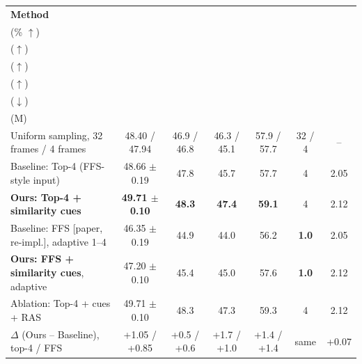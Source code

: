 \documentclass[8pt,a4paper]{article}
\begin{document}
\begin{center}


\label{tab:results}

\small

\begin{tabularx}{\linewidth}{
    @{}X c c c c c c@{}
}

\toprule

\textbf{Method}
&
\makecell{\textbf{Acc}\\(\% $\uparrow$)}
&
\makecell{\textbf{Causal}\\($\uparrow$)}
&
\makecell{\textbf{Temporal}\\($\uparrow$)}
&
\makecell{\textbf{Descr.}\\($\uparrow$)}
&
\makecell{\textbf{Frames}\\($\downarrow$)}
&
\makecell{\textbf{Params}\\(M)}
\\

\midrule

Uniform sampling, 32 frames / 4 frames
& 48.40 / 47.94 & 46.9 / 46.8 & 46.3 / 45.1 & 57.9 / 57.7 & 32 / 4 & -- \\

Baseline: Top-4 (FFS-style input)
& 48.66 $\pm$ 0.19 & 47.8 & 45.7 & 57.7 & 4 & 2.05 \\

\textbf{Ours: Top-4 + similarity cues}
& \textbf{49.71 $\pm$ 0.10} & \textbf{48.3} & \textbf{47.4} & \textbf{59.1} & 4 & 2.12 \\

Baseline: FFS [paper, re-impl.], adaptive 1--4
& 46.35 $\pm$ 0.19 & 44.9 & 44.0 & 56.2 & \textbf{1.0} & 2.05 \\

\textbf{Ours: FFS + similarity cues}, adaptive
& 47.20 $\pm$ 0.10 & 45.4 & 45.0 & 57.6 & \textbf{1.0} & 2.12 \\

Ablation: Top-4 + cues + RAS
& 49.71 $\pm$ 0.10 & 48.3 & 47.3 & 59.3 & 4 & 2.12 \\

\midrule

$\Delta$ (Ours -- Baseline), top-4 / FFS
& +1.05 / +0.85 & +0.5 / +0.6 & +1.7 / +1.0 & +1.4 / +1.4 & same & +0.07 \\

\bottomrule

\end{tabularx}

\end{center}
\end{document}
